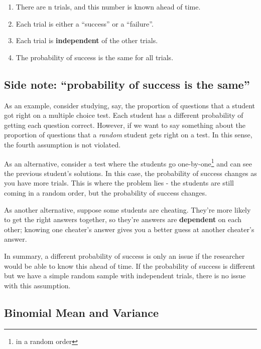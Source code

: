 \documentclass[
  letterpaper,
  DIV=11,
  numbers=noendperiod]{scrreprt}
\providecommand{\tightlist}{%
  \setlength{\itemsep}{0pt}\setlength{\parskip}{0pt}}\usepackage{longtable,booktabs,array}
\begin{document}
\begin{enumerate}
\def\labelenumi{\arabic{enumi}.}
\tightlist
\item
  There are n trials, and this number is known ahead of time.
\item
  Each trial is either a ``success'' or a ``failure''.
\item
  Each trial is \textbf{independent} of the other trials.
\item
  The probability of success is the same for all trials.
\end{enumerate}

\hypertarget{side-note-probability-of-success-is-the-same}{%
\subsection{Side note: ``probability of success is the
same''}\label{side-note-probability-of-success-is-the-same}}

As an example, consider studying, say, the proportion of questions that
a student got right on a multiple choice test. Each student has a
different probability of getting each question correct. However, if we
want to say something about the proportion of questions that a
\emph{random} student gets right on a test. In this sense, the fourth
assumption is not violated.

As an alternative, consider a test where the students go
one-by-one\footnote{in a random order} and can see the previous
student's solutions. In this case, the probability of success changes as
you have more trials. This is where the problem lies - the students are
still coming in a random order, but the probability of success changes.

As another alternative, suppose some students are cheating. They're more
likely to get the right answers together, so they're answers are
\textbf{dependent} on each other; knowing one cheater's answer gives you
a better guess at another cheater's answer.

In summary, a different probability of success is only an issue if the
researcher would be able to know this ahead of time. If the probability
of success is different but we have a simple random sample with
independent trials, there is no issue with this assumption.

\hypertarget{binomial-mean-and-variance}{%
\subsection{Binomial Mean and
Variance}\label{binomial-mean-and-variance}}
\end{document}
